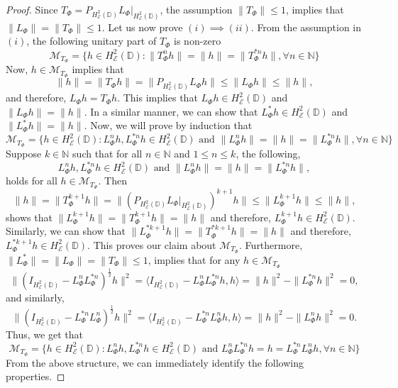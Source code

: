 \documentclass[12pt]{amsart}
\numberwithin{equation}{section}
\theoremstyle{definition}
\newcommand{\Nat}{\mathbb{N}}
\newcommand{\D}{\mathbb{D}}
\newcommand{\1}{{\mbox{\bf 1}}}
\newcommand{\cle}{\mathcal{E}}
\newcommand{\clm}{\mathcal{M}}
\begin{document}
\begin{proof}
Since $T_{\Phi} = P_{H_{\cle}^2(\D)} L_{\Phi}|_{H_{\cle}^2(\D)}$, the assumption $\|T_{\Phi}\| \leq 1$, implies that $\|L_{\Phi}\| = \|T_{\Phi}\| \leq 1$.  Let us now prove $(i) \implies (ii)$.  From the assumption in $(i)$, the following unitary part of $T_{\Phi}$ is non-zero
\[
\clm_{T_{\Phi}} = \{h \in H_{\cle}^2(\D): \|T_{\Phi}^{n}h\| = \|h\| = \|T_{\Phi}^{*n}h\|, \forall n \in \Nat \}
\]
Now, $h \in \clm_{T_{\Phi}}$ implies that
\[
\|h\| = \|T_{\Phi}h\| =\|P_{H_{\cle}^2(\D)} L_{\Phi} h\| \leq \| L_{\Phi} h\| \leq \|h\|,
\]
and therefore, $ L_{\Phi} h = T_{\Phi}h$. This implies that $L_{\Phi}h \in H_{\cle}^2(\D)$ and $\|L_{\Phi}h\| = \|h\|$. In a similar manner, we can show that $L_{\Phi}^* h \in H_{\cle}^2(\D)$ and $\|L_{\Phi}^*h \| = \|h\|$.  Now, we will prove by induction that
\[
\clm_{T_{\Phi}} = \{h \in H_{\cle}^2(\D): L_{\Phi}^{n}h, L_{\Phi}^{*n}h \in H_{\cle}^2(\D) \text{ and } \|L_{\Phi}^{n}h\| = \|h\| = \|L_{\Phi}^{*n}h\|, \forall n \in \Nat \}
\]
Suppose $k \in \Nat$ such that for all $n \in \Nat$ and $1 \leq n \leq k$, the following,
\[
L_{\Phi}^{n}h, L_{\Phi}^{*n}h \in H_{\cle}^2(\D) \text{ and } \|L_{\Phi}^{n}h\| = \|h\| = \|L_{\Phi}^{*n}h\|,
\]
holds for all $h \in \clm_{T_{\Phi}}$. Then 
\[
\|h\| = \|T_{\Phi}^{k+1}h\| =\|(P_{H_{\cle}^2(\D)} L_{\Phi} |_{H_{\cle}^2(\D)})^{k+1} h\| \leq \| L_{\Phi}^{k+1} h\| \leq \|h\|,
\]
shows that $\| L_{\Phi}^{k+1} h\| = \|T_{\Phi}^{k+1}h\| = \|h\|$ and therefore, $L_{\Phi}^{k+1} h \in H_{\cle}^2(\D)$. Similarly, we can show that $\| L_{\Phi}^{*k+1} h\| = \|T_{\Phi}^{*k+1}h\| = \|h\|$ and therefore, $L_{\Phi}^{*k+1} h \in H_{\cle}^2(\D)$. This proves our claim about $\clm_{T_{\Phi}}$. Furthermore, $\|L_{\Phi}^*\| = \|L_{\Phi}\| = \|T_{\Phi}\| \leq 1$, implies that for any $h \in \clm_{T_{\Phi}}$
\[
\|( I_{H_{\cle}^2(\D)} - L_{\Phi}^n L_{\Phi}^{*n})^{\frac{1}{2}}h\|^2 = \langle I_{H_{\cle}^2(\D)} - L_{\Phi}^n L_{\Phi}^{*n}h, h \rangle  = \|h\|^2 - \|L_{\Phi}^{*n} h\|^2 = 0,
\]
and similarly,
\[
\|( I_{H_{\cle}^2(\D)} - L_{\Phi}^{*n} L_{\Phi}^{n})^{\frac{1}{2}}h\|^2 = \langle I_{H_{\cle}^2(\D)} - L_{\Phi}^{*n} L_{\Phi}^{n}h, h \rangle  = \|h\|^2 - \|L_{\Phi}^n h\|^2 = 0.
\]
Thus, we get that 
\begin{equation}\label{structure}
\clm_{T_{\Phi}} = \{h \in H_{\cle}^2(\D): L_{\Phi}^{n}h, L_{\Phi}^{*n}h \in H_{\cle}^2(\D) \text{ and } L_{\Phi}^{n}L_{\Phi}^{*n}h= h = L_{\Phi}^{*n}L_{\Phi}^{n}h, \forall n \in \Nat \}
\end{equation}
From the above structure, we can immediately identify the following properties.

\end{proof}
\end{document}

